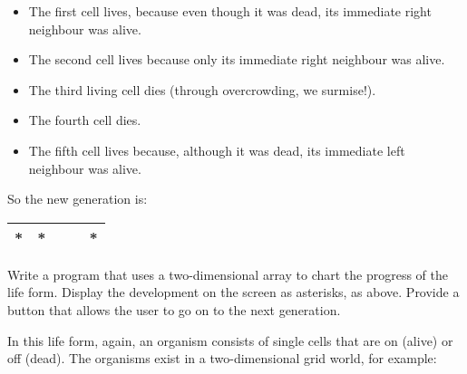 \begin{EXE}
				\begin{itemize}
		      \item The first cell lives, because even though it was dead, its immediate right neighbour was alive.
		      \item The second cell lives because only its immediate right neighbour was alive.
		      \item The third living cell dies (through overcrowding, we surmise!).
		      \item The fourth cell dies.
     			\item The fifth cell lives because, although it was dead, its immediate left neighbour was alive.
				\end{itemize}
				So the new generation is:
				\begin{center}
					\begin{tabular}{|c|c|c|c|c|}
						\hline
						*	& *	& & & *	\\ \hline
					\end{tabular}
				\end{center}

				Write a program that uses a two-dimensional array to chart the progress of the life form. Display the development on the screen as asterisks, as above. Provide a button that allows the user to go on to the next generation.
			\item	{} In this life form, again, an organism consists of single cells that are on (alive) or off (dead). The organisms exist in a two-dimensional grid world, for example:


\end{EXE}
